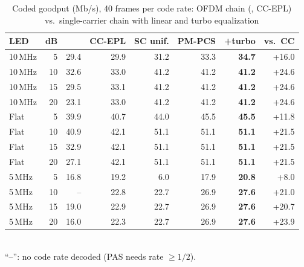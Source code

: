 \begin{table}[t]\centering\footnotesize\setlength{\tabcolsep}{2.6pt}
\caption{Coded goodput (Mb/s), 40 frames per code rate: OFDM chain (\cite{pham2026}, CC-EPL) vs.\ single-carrier chain with linear and turbo equalization}\label{tab:pmcoded}
\begin{tabular}{@{}lrrrrrrr@{}}\toprule
LED & dB & \cite{pham2026} & CC-EPL & SC unif. & PM-PCS & \textbf{+turbo} & vs.\ CC \\\midrule
10\,MHz & 5 & 29.4 & 29.9 & 31.2 & 33.3 & \textbf{34.7} & +16.0 \\
10\,MHz & 10 & 32.6 & 33.0 & 41.2 & 41.2 & \textbf{41.2} & +24.6 \\
10\,MHz & 15 & 29.5 & 33.1 & 41.2 & 41.2 & \textbf{41.2} & +24.6 \\
10\,MHz & 20 & 23.1 & 33.0 & 41.2 & 41.2 & \textbf{41.2} & +24.6 \\
Flat & 5 & 39.9 & 40.7 & 44.0 & 45.5 & \textbf{45.5} & +11.8 \\
Flat & 10 & 40.9 & 42.1 & 51.1 & 51.1 & \textbf{51.1} & +21.5 \\
Flat & 15 & 32.9 & 42.1 & 51.1 & 51.1 & \textbf{51.1} & +21.5 \\
Flat & 20 & 27.1 & 42.1 & 51.1 & 51.1 & \textbf{51.1} & +21.5 \\
5\,MHz & 5 & 16.8 & 19.2 & 6.0 & 17.9 & \textbf{20.8} & +8.0 \\
5\,MHz & 10 & -- & 22.8 & 22.7 & 26.9 & \textbf{27.6} & +21.0 \\
5\,MHz & 15 & 19.0 & 22.9 & 22.7 & 26.9 & \textbf{27.6} & +20.7 \\
5\,MHz & 20 & 16.0 & 22.3 & 22.7 & 26.9 & \textbf{27.6} & +23.9 \\
\bottomrule\end{tabular}
\vspace{1mm}\\\footnotesize ``--'': no code rate decoded (PAS needs rate $\ge 1/2$).\end{table}
